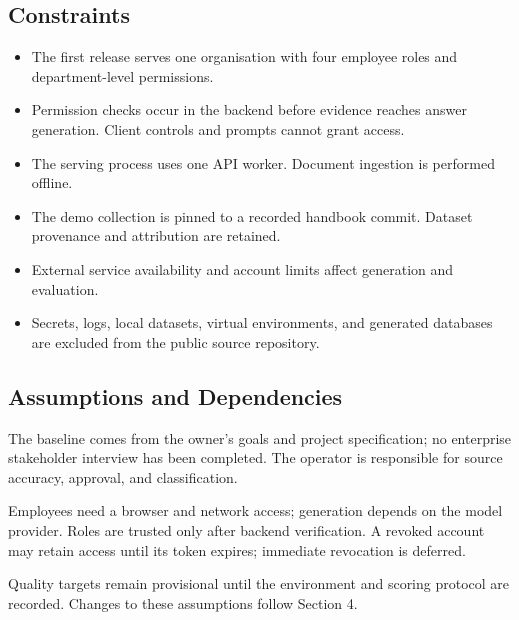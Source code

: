 \documentclass[11pt,letterpaper]{article}
\begin{document}
\subsection{Constraints}

\begin{itemize}

\item The first release serves one organisation with four employee roles and department-level permissions.

\item Permission checks occur in the backend before evidence reaches answer generation. Client controls and prompts cannot grant access.

\item The serving process uses one API worker. Document ingestion is performed offline.

\item The demo collection is pinned to a recorded handbook commit. Dataset provenance and attribution are retained.

\item External service availability and account limits affect generation and evaluation.

\item Secrets, logs, local datasets, virtual environments, and generated databases are excluded from the public source repository.

\end{itemize}

\subsection{Assumptions and Dependencies}

The baseline comes from the owner's goals and project specification; no enterprise stakeholder interview has been completed. The operator is responsible for source accuracy, approval, and classification.\par

Employees need a browser and network access; generation depends on the model provider. Roles are trusted only after backend verification. A revoked account may retain access until its token expires; immediate revocation is deferred.\par

Quality targets remain provisional until the environment and scoring protocol are recorded. Changes to these assumptions follow Section 4.\par
\end{document}
